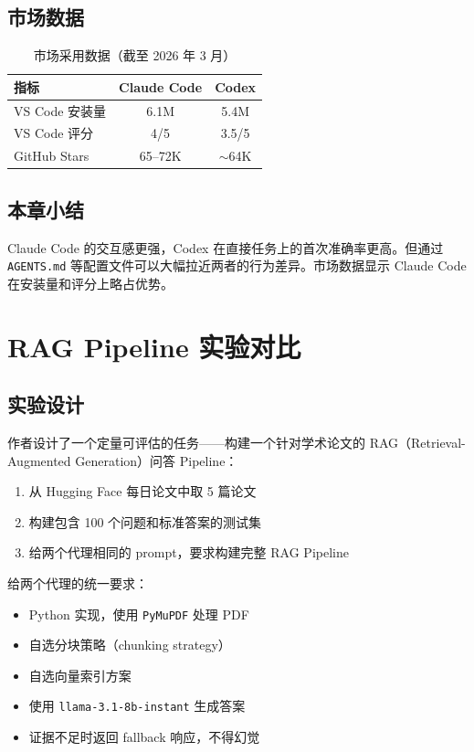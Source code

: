 \documentclass[a4paper]{article}
\begin{document}
\subsection{市场数据}

\begin{table}[H]
\centering
\caption{市场采用数据（截至 2026 年 3 月）}
\begin{tabular}{lcc}
\toprule
\textbf{指标} & \textbf{Claude Code} & \textbf{Codex} \\
\midrule
VS Code 安装量 & 6.1M & 5.4M \\
VS Code 评分 & 4/5 & 3.5/5 \\
GitHub Stars & 65--72K & $\sim$64K \\
\bottomrule
\end{tabular}
\end{table}

\subsection{本章小结}

Claude Code 的交互感更强，Codex 在直接任务上的首次准确率更高。但通过 \texttt{AGENTS.md} 等配置文件可以大幅拉近两者的行为差异。市场数据显示 Claude Code 在安装量和评分上略占优势。

\section{RAG Pipeline 实验对比}

\subsection{实验设计}

作者设计了一个定量可评估的任务——构建一个针对学术论文的 RAG（Retrieval-Augmented Generation）问答 Pipeline：

\begin{enumerate}
    \item 从 Hugging Face 每日论文中取 5 篇论文
    \item 构建包含 100 个问题和标准答案的测试集
    \item 给两个代理相同的 prompt，要求构建完整 RAG Pipeline
\end{enumerate}

给两个代理的统一要求：
\begin{itemize}
    \item Python 实现，使用 \texttt{PyMuPDF} 处理 PDF
    \item 自选分块策略（chunking strategy）
    \item 自选向量索引方案
    \item 使用 \texttt{llama-3.1-8b-instant} 生成答案
    \item 证据不足时返回 fallback 响应，不得幻觉
\end{itemize}
\end{document}
